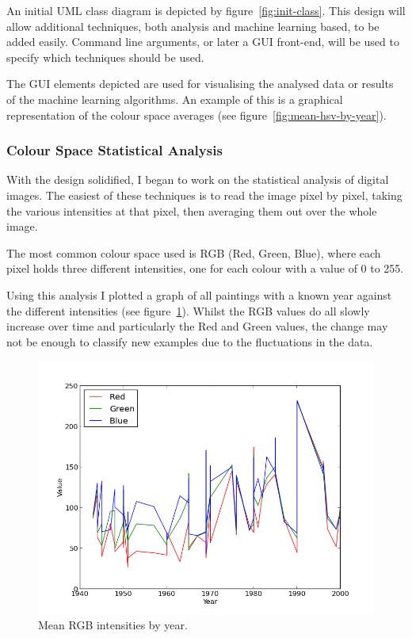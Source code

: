 \documentclass[11pt,fleqn,twoside]{article}
\begin{document}
An initial UML class diagram is depicted by figure~\ref{fig:init-class}. This design will allow 
additional techniques, both analysis and machine learning based, to be added easily. Command line
arguments, or later a GUI front-end, will be used to specify which techniques should be used.

The GUI elements depicted are used for visualising the analysed data or results of the machine
learning algorithms. An example of this is a graphical representation of the colour space averages
(see figure~\ref{fig:mean-hsv-by-year}).

\subsubsection{Colour Space Statistical Analysis}
With the design solidified, I began to work on the statistical analysis of digital images. The 
easiest of these techniques is to read the image pixel by pixel, taking the various intensities at
that pixel, then averaging them out over the whole image.

The most common colour space used is RGB (Red, Green, Blue), where each pixel holds three different
intensities, one for each colour with a value of 0 to 255.

Using this analysis I plotted a graph of all paintings with a known year against the different 
intensities (see figure~\ref{fig:mean-rgb-by-year}). Whilst the RGB values do all slowly increase
over time and particularly the Red and Green values, the change may not be enough to classify new
examples due to the fluctuations in the data. 

\begin{figure}[p]
\includegraphics[scale=0.5]{img/kyffin-rgp-avg.png}
\caption{Mean RGB intensities by year.}
\label{fig:mean-rgb-by-year}
\end{figure}
\end{document}
